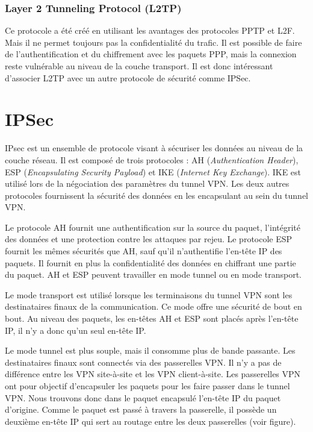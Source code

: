\subsubsection{Layer 2 Tunneling Protocol (L2TP)}
Ce protocole a été créé en utilisant les avantages des protocoles PPTP et L2F. 
Mais il ne permet toujours pas la confidentialité du trafic. 
Il est possible de faire de l'authentification et du chiffrement avec les paquets PPP, mais la connexion reste vulnérable au niveau de la couche transport. 
Il est donc intéressant d'associer L2TP avec un autre protocole de sécurité comme IPSec.

\section{IPSec}
IPsec est un ensemble de protocole visant à sécuriser les données au niveau de la couche réseau. 
Il est composé de trois protocoles : AH (\textit{Authentication Header}), ESP (\textit{Encapsulating Security Payload}) et IKE (\textit{Internet Key Exchange}).
IKE est utilisé lors de la négociation des paramètres du tunnel VPN. 
Les deux autres protocoles fournissent la sécurité des données en les encapsulant au sein du tunnel VPN. 

Le protocole AH fournit une authentification sur la source du paquet, l'intégrité des données et une protection contre les attaques par rejeu. 
Le protocole ESP fournit les mêmes sécurités que AH, sauf qu'il n'authentifie l'en-tête IP des paquets. 
Il fournit en plus la confidentialité des données en chiffrant une partie du paquet. 
AH et ESP peuvent travailler en mode tunnel ou en mode transport. 

Le mode transport est utilisé lorsque les terminaisons du tunnel VPN sont les destinataires finaux de la communication. 
Ce mode offre une sécurité de bout en bout. 
Au niveau des paquets, les en-têtes AH et ESP sont placés après l'en-tête IP, il n'y a donc qu'un seul en-tête IP.

Le mode tunnel est plus souple, mais il consomme plus de bande passante. 
Les destinataires finaux sont connectés via des passerelles VPN. 
Il n'y a pas de différence entre les VPN site-à-site et les VPN client-à-site. 
Les passerelles VPN ont pour objectif d'encapsuler les paquets pour les faire passer dans le tunnel VPN. 
Nous trouvons donc dans le paquet encapsulé l'en-tête IP du paquet d'origine. 
Comme le paquet est passé à travers la passerelle, il possède un deuxième en-tête IP qui sert au routage entre les deux passerelles (voir figure). 

